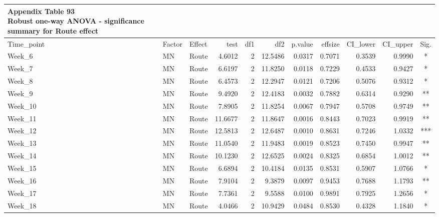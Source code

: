\documentclass[
  12pt,
  letterpaper,
]{article}
\begin{document}
\begingroup
\fontsize{12.0pt}{14.4pt}\selectfont
\begin{longtable}{lllrrrrrrrc}
\caption*{
{\large \textbf{Appendix Table 93}} \\ 
{\small \textbf{Robust one-way ANOVA - significance summary for Route effect}}
} \\ 
\toprule
Time\_point & {Factor} & {Effect} & {test} & {df1} & {df2} & {p.value} & {effsize} & CI\_lower & CI\_upper & {Sig.} \\ 
\midrule\addlinespace[2.5pt]
Week\_6 & MN & Route & 4.6012 & 2 & 12.5486 & 0.0317 & 0.7071 & 0.3539 & 0.9990 & * \\ 
Week\_7 & MN & Route & 6.6197 & 2 & 11.8250 & 0.0118 & 0.7229 & 0.4533 & 0.9427 & * \\ 
Week\_8 & MN & Route & 6.4573 & 2 & 12.2947 & 0.0121 & 0.7206 & 0.5076 & 0.9312 & * \\ 
Week\_9 & MN & Route & 9.4920 & 2 & 12.4183 & 0.0032 & 0.7882 & 0.6314 & 0.9290 & ** \\ 
Week\_10 & MN & Route & 7.8905 & 2 & 11.8254 & 0.0067 & 0.7947 & 0.5708 & 0.9749 & ** \\ 
Week\_11 & MN & Route & 11.6677 & 2 & 11.8647 & 0.0016 & 0.8443 & 0.7023 & 0.9919 & ** \\ 
Week\_12 & MN & Route & 12.5813 & 2 & 12.6487 & 0.0010 & 0.8631 & 0.7246 & 1.0332 & *** \\ 
Week\_13 & MN & Route & 11.0540 & 2 & 11.9483 & 0.0019 & 0.8523 & 0.7450 & 0.9947 & ** \\ 
Week\_14 & MN & Route & 10.1230 & 2 & 12.6525 & 0.0024 & 0.8325 & 0.6854 & 1.0012 & ** \\ 
Week\_15 & MN & Route & 6.6894 & 2 & 10.4184 & 0.0135 & 0.8531 & 0.5907 & 1.0766 & * \\ 
Week\_16 & MN & Route & 7.9104 & 2 & 9.3879 & 0.0097 & 0.9453 & 0.7688 & 1.1793 & ** \\ 
Week\_17 & MN & Route & 7.7361 & 2 & 9.5588 & 0.0100 & 0.9891 & 0.7925 & 1.2656 & * \\ 
Week\_18 & MN & Route & 4.0466 & 2 & 10.9429 & 0.0484 & 0.8530 & 0.4328 & 1.1840 & * \\ 
\bottomrule
\end{longtable}
\endgroup
\end{document}
